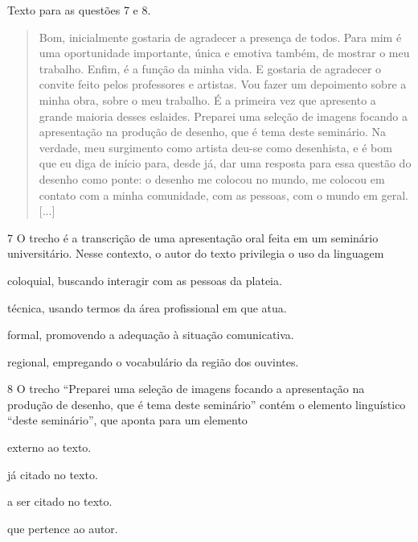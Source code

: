 Texto para as questões 7 e 8.

\begin{quote}
Bom, inicialmente gostaria de agradecer a presença de todos. Para mim é
uma oportunidade importante, única e emotiva também, de mostrar o meu
trabalho. Enfim, é a função da minha vida. E gostaria de agradecer o
convite feito pelos professores e artistas. Vou fazer um depoimento
sobre a minha obra, sobre o meu trabalho. É a primeira vez que apresento
a grande maioria desses eslaides. Preparei uma seleção de imagens
focando a apresentação na produção de desenho, que é tema deste
seminário. Na verdade, meu surgimento como artista deu-se como
desenhista, e é bom que eu diga de início para, desde já, dar uma
resposta para essa questão do desenho como ponte: o desenho me colocou
no mundo, me colocou em contato com a minha comunidade, com as pessoas,
com o mundo em geral. {[}...{]}

\end{quote}

\num{7} O trecho é a transcrição de uma apresentação oral feita em um seminário
universitário. Nesse contexto, o autor do texto privilegia o uso da
linguagem

\begin{escolha}
\item
  coloquial, buscando interagir com as pessoas da plateia.
\item
  técnica, usando termos da área profissional em que atua.
\item
  formal, promovendo a adequação à situação comunicativa.
\item
  regional, empregando o vocabulário da região dos ouvintes.
\end{escolha}

\num{8} O trecho ``Preparei uma seleção de imagens focando a apresentação na
produção de desenho, que é tema deste seminário'' contém o elemento
linguístico ``deste seminário'', que aponta para um elemento

\begin{escolha}
\item externo ao texto.

\item já citado no texto.

\item a ser citado no texto.

\item que pertence ao autor.
\end{escolha}

